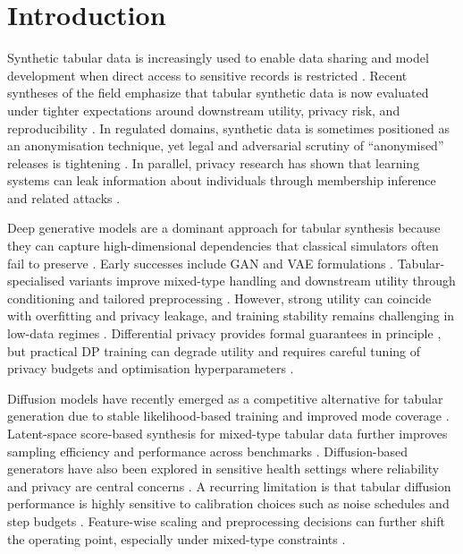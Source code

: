 \documentclass[preprint,12pt]{elsarticle}
\begin{document}
\section{Introduction}
Synthetic tabular data is increasingly used to enable data sharing and model development when direct access to sensitive records is restricted \cite{Kindji2025}. Recent syntheses of the field emphasize that tabular synthetic data is now evaluated under tighter expectations around downstream utility, privacy risk, and reproducibility \cite{cormode2025synthetic_tabular_kdd}. In regulated domains, synthetic data is sometimes positioned as an anonymisation technique, yet legal and adversarial scrutiny of ``anonymised'' releases is tightening \cite{Pilgram2025}. In parallel, privacy research has shown that learning systems can leak information about individuals through membership inference and related attacks \cite{Shokri2017}.

Deep generative models are a dominant approach for tabular synthesis because they can capture high-dimensional dependencies that classical simulators often fail to preserve \cite{Kindji2025}. Early successes include GAN and VAE formulations \cite{Goodfellow2014}. Tabular-specialised variants improve mixed-type handling and downstream utility through conditioning and tailored preprocessing \cite{Xu2019a}. However, strong utility can coincide with overfitting and privacy leakage, and training stability remains challenging in low-data regimes \cite{Alaa2022}. Differential privacy provides formal guarantees in principle \cite{Dwork2014}, but practical DP training can degrade utility and requires careful tuning of privacy budgets and optimisation hyperparameters \cite{Abadi2016}.

Diffusion models have recently emerged as a competitive alternative for tabular generation due to stable likelihood-based training and improved mode coverage \cite{Kotelnikov2023}. Latent-space score-based synthesis for mixed-type tabular data further improves sampling efficiency and performance across benchmarks \cite{Zhang2024}. Diffusion-based generators have also been explored in sensitive health settings where reliability and privacy are central concerns \cite{Tian2024}. A recurring limitation is that tabular diffusion performance is highly sensitive to calibration choices such as noise schedules and step budgets \cite{karras2022edm_neurips}. Feature-wise scaling and preprocessing decisions can further shift the operating point, especially under mixed-type constraints \cite{VillaizanVallelado2025}.
\end{document}
